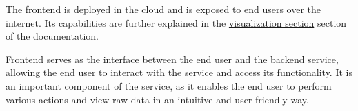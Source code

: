 The frontend is deployed in the cloud and is exposed to end users over the internet. Its capabilities are further explained in the \hyperref[sec:0308]{visualization section} section of the documentation.

Frontend serves as the interface between the end user and the backend service, allowing the end user to interact with the service and access its functionality. It is an important component of the service, as it enables the end user to perform various actions and view raw data in an intuitive and user-friendly way.

